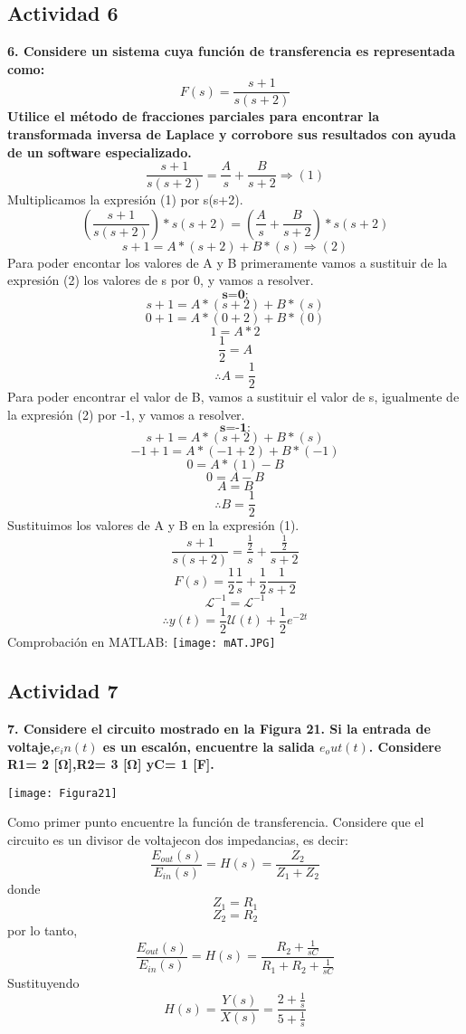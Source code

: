 {\subsection{Actividad 6}
\noindent\textbf{6. Considere un sistema cuya función de transferencia es representada como:
\[
F(s)=\frac{s+1}{s(s+2)}
\]
Utilice el método de fracciones parciales para encontrar la transformada inversa de Laplace y corrobore sus resultados con ayuda de un software especializado.}	
\[
\frac{s+1}{s(s+2)}=\frac{A}{s}+\frac{B}{s+2}{\Longrightarrow}(1)
\]
Multiplicamos la expresión (1) por s(s+2).
\[
(\frac{s+1}{s(s+2)})*s(s+2)=(\frac{A}{s}+\frac{B}{s+2})*s(s+2)
\]
\[
s+1=A*(s+2)+B*(s){\Longrightarrow}(2)
\]
Para poder encontar los valores de A y B primeramente vamos a sustituir de la expresión (2) los valores de s por 0, y vamos a resolver.
\[
\textbf{s=0:}
\]
\[
s+1=A*(s+2)+B*(s)
\]
\[
0+1=A*(0+2)+B*(0)
\]
\[
1=A*2
\]
\[
\frac{1}{2}=A
\]
\[
\therefore A=\frac{1}{2}
\]
Para poder encontrar el valor de B, vamos a sustituir el valor de s, igualmente de la expresión (2) por -1, y vamos a resolver.
\[
\textbf{s=-1:}
\]
\[
s+1=A*(s+2)+B*(s)
\]
\[
-1+1=A*(-1+2)+B*(-1)
\]
\[
0=A*(1)-B
\]
\[
0=A-B
\]
\[
A=B
\]
\[
\therefore B=\frac{1}{2}
\]
Sustituimos los valores de A y B en la expresión (1).
\[
\frac{s+1}{s(s+2)}=\frac{\frac{1}{2}}{s}+\frac{\frac{1}{2}}{s+2}
\]
\[
F(s)=\frac{1}{2}\frac{1}{s}+\frac{1}{2}\frac{1}{s+2}
\]
\[
\mathcal{L}^{-1}=\mathcal{L}^{-1}
\]
\[
\therefore{y(t)=\frac{1}{2}\mathscr{U}(t)+\frac{1}{2}e^{-2t}}
\]
Comprobación en MATLAB:
\texttt{[image: mAT.JPG]}

\subsection{Actividad 7}
\noindent\textbf{7.  Considere el circuito mostrado en la Figura 21. Si la entrada de voltaje,$e_in(t)$ es un escalón, encuentre la salida $e_out(t)$. Considere R1= 2 [Ω],R2= 3 [Ω] yC= 1 [F].}
	\begin{center}
		\texttt{[image: Figura21]}
	\end{center}
	\noindent Como primer punto encuentre la función de transferencia. Considere que el circuito es un divisor de voltajecon dos impedancias, es decir:
	\begin{equation}
		\frac{E_{out}(s)}{E_{in}(s)}=H(s)=\frac{Z_2}{Z_1+Z_2}
	\end{equation}
	donde
	\begin{equation}
		Z_1=R_1
	\end{equation}
	\begin{equation}
		Z_2=R_2
	\end{equation}
	por lo tanto, 
	\begin{equation}
		\frac{E_{out}(s)}{E_{in}(s)}=H(s)=\frac{R_2+\frac{1}{sC}}{R_1+R_2+\frac{1}{sC}}
	\end{equation}
	Sustituyendo
		\begin{equation}
H(s)=\frac{Y(s)}{X(s)}=\frac{2+\frac{1}{s}}{5+\frac{1}{s}}
	\end{equation}
	
}
